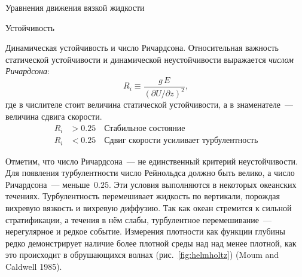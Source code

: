 \begin{chapter}{Уравнения движения вязкой жидкости}
\begin{section}{Устойчивость}
\begin{paragraph}{Динамическая устойчивость и число Ричардсона.}
Относительная важность статической устойчивости и динамической
не\-устойчивости выражается 
\emph{числом Ричардсона}:
\begin{equation}
 \boxed{R_i\equiv\frac{g\,E}{(\partial{U}/\partial{z})^2},}
\end{equation}
где в числителе стоит величина статической устойчивости, а в
знаменателе~--- величина сдвига скорости.
\begin{align*}
R_i &>0.25 \quad \text{Стабильное состояние} \\
R_i &<0.25 \quad \text{Сдвиг скорости усиливает турбулентность} 
\end{align*}
%

Отметим, что число Ричардсона~--- не единственный критерий
неустойчивости. Для появления турбулентности число Рейнольдса должно
быть велико, а число Ричардсона~--- меньше~$0.25$. Эти условия выполняются
в некоторых океанских течениях. Турбулентность перемешивает жидкость
по вертикали, порождая вихревую вязкость и вихревую диффузию. Так как
океан стремится к сильной стратификации, а течения в нём слабы,
турбулентное перемешивание~--- нерегулярное и редкое событие. Измерения
плотности как функции глубины редко демонстрирует наличие более
плотной среды над над менее плотной, как это происходит в обрушающихся
волнах (рис.~\ref{fig:helmholtz}) (Moum and Caldwell 1985).
%
\end{paragraph}


\end{section}
\end{chapter}
